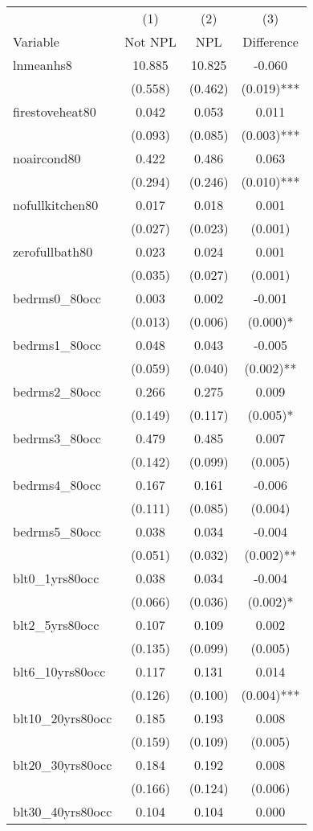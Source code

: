 \begin{tabular}{lccc}
\hline\hline
 & (1) & (2) & (3)   \\
Variable & Not NPL & NPL & Difference   \\
\hline
lnmeanhs8&10.885&10.825&-0.060\\
&(0.558)&(0.462)&(0.019)***\\
firestoveheat80&0.042&0.053&0.011\\
&(0.093)&(0.085)&(0.003)***\\
noaircond80&0.422&0.486&0.063\\
&(0.294)&(0.246)&(0.010)***\\
nofullkitchen80&0.017&0.018&0.001\\
&(0.027)&(0.023)&(0.001)\\
zerofullbath80&0.023&0.024&0.001\\
&(0.035)&(0.027)&(0.001)\\
bedrms0\_80occ&0.003&0.002&-0.001\\
&(0.013)&(0.006)&(0.000)*\\
bedrms1\_80occ&0.048&0.043&-0.005\\
&(0.059)&(0.040)&(0.002)**\\
bedrms2\_80occ&0.266&0.275&0.009\\
&(0.149)&(0.117)&(0.005)*\\
bedrms3\_80occ&0.479&0.485&0.007\\
&(0.142)&(0.099)&(0.005)\\
bedrms4\_80occ&0.167&0.161&-0.006\\
&(0.111)&(0.085)&(0.004)\\
bedrms5\_80occ&0.038&0.034&-0.004\\
&(0.051)&(0.032)&(0.002)**\\
blt0\_1yrs80occ&0.038&0.034&-0.004\\
&(0.066)&(0.036)&(0.002)*\\
blt2\_5yrs80occ&0.107&0.109&0.002\\
&(0.135)&(0.099)&(0.005)\\
blt6\_10yrs80occ&0.117&0.131&0.014\\
&(0.126)&(0.100)&(0.004)***\\
blt10\_20yrs80occ&0.185&0.193&0.008\\
&(0.159)&(0.109)&(0.005)\\
blt20\_30yrs80occ&0.184&0.192&0.008\\
&(0.166)&(0.124)&(0.006)\\
blt30\_40yrs80occ&0.104&0.104&0.000\\

\end{tabular}
